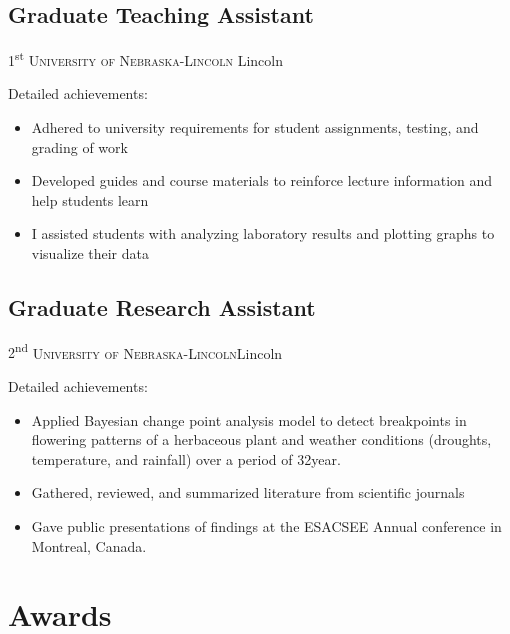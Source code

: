 \documentclass[11pt,a4paper,sans]{moderncv} %
\begin{document}
\subsection{Graduate Teaching Assistant}

{1\textsuperscript{st}}
{\textsc{University of Nebraska-Lincoln}}
{Lincoln}
{}{
Detailed achievements:
\begin{itemize}
\item Adhered to university requirements for student assignments, testing, and grading of work
\item Developed guides and course materials to reinforce lecture information and help students learn
\item I assisted students with analyzing laboratory results and plotting graphs to visualize their data
\end{itemize}}


\subsection{Graduate Research Assistant}

{2\textsuperscript{nd}}
{\textsc{University of Nebraska-Lincoln}}{Lincoln}
{}{
Detailed achievements:
\begin{itemize}
\item Applied Bayesian change point analysis model to detect breakpoints in flowering patterns of a herbaceous plant and weather conditions (droughts, temperature, and rainfall) over a period of 32year.
\item Gathered, reviewed, and summarized literature from scientific journals
\item Gave public presentations of findings at the ESACSEE Annual conference in Montreal, Canada.
\end{itemize}}


\section{Awards}

\end{document}

